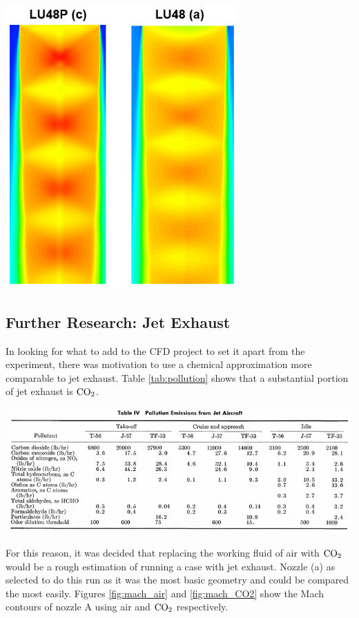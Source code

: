 \documentclass[12pt]{article} %
\begin{document}
\begin{center}
    \includegraphics[width=3.5in]{VenaContracta_CFD.PNG}
    \label{fig:VenaContractaCFD}
\end{center}


\subsection{Further Research: Jet Exhaust}

In looking for what to add to the CFD project to set it apart from the experiment, there was motivation to use a chemical approximation more comparable to jet exhaust. Table \ref{tab:pollution} shows that a substantial portion of jet exhaust is $\textnormal{CO}_2$. 

\begin{center}
    \includegraphics[width=\linewidth]{JetPollutionTable.png}
    \label{tab:pollution}
\end{center}
For this reason, it was decided that replacing the working fluid of air with $\textnormal{CO}_2$ would be a rough estimation of running a case with jet exhaust. Nozzle (a) as selected to do this run as it was the most basic geometry and could be compared the most easily. Figures \ref{fig:mach_air} and \ref{fig:mach_CO2} show the Mach contours of nozzle A using air and $\textnormal{CO}_2$ respectively.
\end{document}
